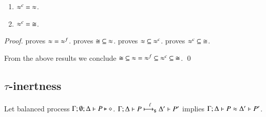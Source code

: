 
\begin{theorem}[Concidence]
	\begin{enumerate}
		\item	$\approx^{c}\ =\ \approx$.
		\item	$\approx^{c}\ =\ \cong$.
	\end{enumerate}
\end{theorem}

\begin{proof}
	\noi	{} proves $\wb\ =\ \wbf$.
		 proves $\cong\ \subseteq\ \wb$.
		 proves $\wb\ \subseteq\ \wbc$.
		 proves $\wbc\ \subseteq\ \cong$.

	\noi From the above results we conclude $\cong\ \subseteq\ \wb\ =\ \wbf\ \subseteq\ \wbc\ \subseteq\ \cong$. 
	\qed
\end{proof}


\subsection{$\tau$-inertness}
\label{app:sub_tau_inert}

\begin{proposition}\rm
	Let balanced \HOp process $\Gamma; \emptyset; \Delta \vdash P \triangleright \diamond$.
	$\Gamma; \Delta \vdash P \stackrel{\ell}{\longmapsto_{\mathsf{s}}} \Delta' \vdash P'$ implies
	$\Gamma; \Delta \vdash P \approx \Delta' \vdash P'$.
\end{proposition}

